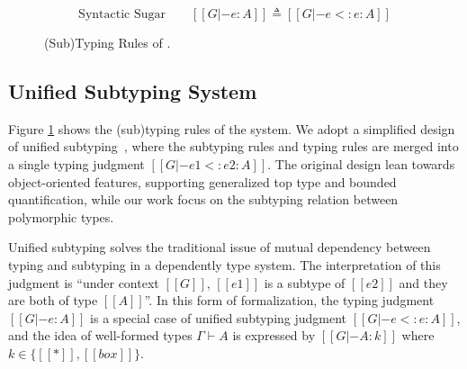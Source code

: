 \begin{figure}
    \begin{equation*}
       \text{Syntactic Sugar} \qquad [[G |- e : A]] \triangleq [[G |- e <: e : A]]
    \end{equation*}
    \caption{(Sub)Typing Rules of \name.}
    \label{fig:typing}
\end{figure}

\subsection{Unified Subtyping System}
\label{sec:type-system}

Figure \ref{fig:typing} shows the (sub)typing rules of the system. We adopt a
simplified design of unified subtyping~\cite{yang2017unifying}, where the subtyping rules and
typing rules are merged into a single typing judgment $[[G |- e1 <: e2 : A]]$.
The original design lean towards object-oriented features,
supporting generalized top type and bounded quantification,
while our work focus on the subtyping relation between polymorphic types.

Unified subtyping solves the traditional issue of mutual dependency between typing
and subtyping in a dependently type system.
The interpretation of this judgment is ``under context $[[G]]$, $[[e1]]$ is a
subtype of $[[e2]]$ and they are both of type $[[A]]$''.
In this form of formalization, the typing judgment $[[G |- e : A]]$ is a
special case of unified subtyping judgment $[[G |- e <: e : A]]$,
and the idea of well-formed types $\Gamma \vdash A$ is expressed by
$[[G |- A : k]]$ where $k \in \{[[*]], [[box]]\}$.

